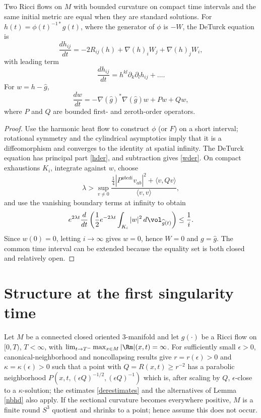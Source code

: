 Two Ricci flows on $M$ with bounded curvature on compact time intervals and the
same initial metric are equal when they are standard solutions. For
$h(t)=\phi(t)^{-1*}g(t)$, where the generator of $\phi$ is $-W$, the
DeTurck equation is
\begin{equation} \label{heqn}
\frac{dh_{ij}}{dt}=-2R_{ij}(h)+\nabla(h)_iW_j+\nabla(h)_jW_i,
\end{equation}
with leading term
\begin{equation} \label{hder}
\frac{dh_{ij}}{dt}=h^{kl}\partial_k\partial_lh_{ij}+\ldots.
\end{equation}
For $w=h-\widehat g$,
\begin{equation} \label{wder}
\frac{dw}{dt}=-\nabla(\widehat g)^*\nabla(\widehat g)w+Pw+Qw,
\end{equation}
where $P$ and $Q$ are bounded first- and zeroth-order operators.
\begin{proof}
\sketch Use the harmonic heat flow to construct $\phi$ (or $F$) on a short
interval; rotational symmetry and the cylindrical asymptotics imply that it is
a diffeomorphism and converges to the identity at spatial infinity. The
DeTurck equation has principal part \eqref{hder}, and subtraction gives
\eqref{wder}. On compact exhaustions $K_i$, integrate against $w$, choose
\begin{equation}
\lambda>\sup_{v\ne0}\frac{\frac14|P^{abcdi}v_{ab}|^2+\langle v,Qv\rangle}{\langle v,v\rangle},
\end{equation}
and use the vanishing boundary terms at infinity to obtain
\begin{equation}
e^{2\lambda t}\frac{d}{dt}\left(\frac12e^{-2\lambda t}\int_{K_i}|w|^2\,d\vol_{\widehat g(t)}\right)\leq\frac1i.
\end{equation}
Since $w(0)=0$, letting $i\to\infty$ gives $w=0$, hence $W=0$ and
$g=\widehat g$. The common time interval can be extended because the equality
set is both closed and relatively open.
\end{proof}

\section{Structure at the first singularity time}
 \label{II.3}

Let $M$ be a connected closed oriented $3$-manifold and let $g(\cdot)$ be a
Ricci flow on $[0,T)$, $T<\infty$, with
$\lim_{t\to T^-}\max_{x\in M}|\Rm|(x,t)=\infty$. For sufficiently small
$\epsilon>0$, canonical-neighborhood and noncollapsing results give
$r=r(\epsilon)>0$ and $\kappa=\kappa(\epsilon)>0$ such that a point with
$Q=R(x,t)\geq r^{-2}$ has a parabolic neighborhood
$P(x,t,(\epsilon Q)^{-1/2},(\epsilon Q)^{-1})$ which is, after scaling by
$Q$, $\epsilon$-close to a $\kappa$-solution; the estimates
\eqref{derestimates} and the alternatives of Lemma \ref{nbhd} also apply.
If the sectional curvature becomes everywhere positive, $M$ is a finite round
$S^3$ quotient and shrinks to a point; hence assume this does not occur.

